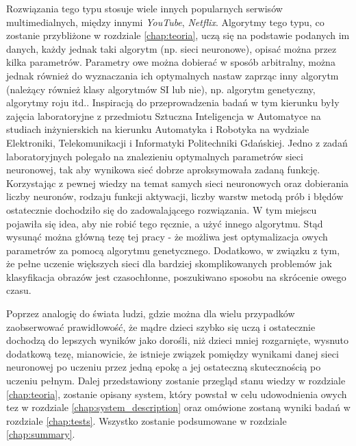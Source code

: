 Rozwiązania tego typu stosuje wiele innych popularnych serwisów multimedialnych, między innymi \textit{YouTube}, \textit{Netflix}.
Algorytmy tego typu, co zostanie przybliżone w rozdziale \ref{chap:teoria}, uczą się na podstawie podanych im danych, każdy jednak taki algorytm (np. sieci neuronowe), opisać można przez kilka parametrów.
Parametry owe można dobierać w sposób arbitralny, można jednak również do wyznaczania ich optymalnych nastaw zaprząc inny algorytm (należący również klasy algorytmów SI lub nie), np. algorytm genetyczny, algorytmy roju itd..
Inspiracją do przeprowadzenia badań w tym kierunku były zajęcia laboratoryjne z przedmiotu Sztuczna Inteligencja w Automatyce na studiach inżynierskich na kierunku Automatyka i Robotyka na wydziale Elektroniki, Telekomunikacji i Informatyki Politechniki Gdańskiej.
Jedno z zadań laboratoryjnych polegało na znalezieniu optymalnych parametrów sieci neuronowej, tak aby wynikowa sieć dobrze aproksymowała zadaną funkcję.
Korzystając z pewnej wiedzy na temat samych sieci neuronowych oraz dobierania liczby neuronów, rodzaju funkcji aktywacji, liczby warstw metodą prób i błędów ostatecznie dochodziło się do zadowalającego rozwiązania.
W tym miejscu pojawiła się idea, aby nie robić tego ręcznie, a użyć innego algorytmu.
Stąd wysunąć można główną tezę tej pracy - że możliwa jest optymalizacja owych parametrów za pomocą algorytmu genetycznego.
Dodatkowo, w związku z tym, że pełne uczenie większych sieci dla bardziej skomplikowanych problemów jak klasyfikacja obrazów jest czasochłonne, poszukiwano sposobu na skrócenie owego czasu.

Poprzez analogię do świata ludzi, gdzie można dla wielu przypadków zaobserwować prawidłowość, że mądre dzieci szybko się uczą i ostatecznie dochodzą do lepszych wyników jako dorośli, niż dzieci mniej rozgarnięte, wysnuto dodatkową tezę, mianowicie, że istnieje związek pomiędzy wynikami danej sieci neuronowej po uczeniu przez jedną epokę a jej ostateczną skutecznością po uczeniu pełnym.
Dalej przedstawiony zostanie przegląd stanu wiedzy w rozdziale \ref{chap:teoria}, zostanie opisany system, który powstał w celu udowodnienia owych tez w rozdziale \ref{chap:system_description} oraz omówione zostaną wyniki badań w rozdziale \ref{chap:tests}.
Wszystko zostanie podsumowane w rozdziale \ref{chap:summary}.
